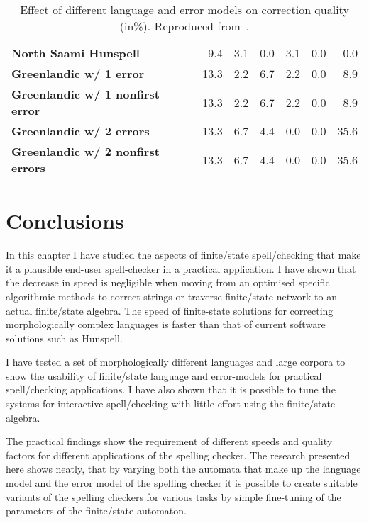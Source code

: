 \documentclass[officiallayout,final]{unihelcompling}
\begin{document}
\begin{table}
\begin{tabular}{|l|r|r|r|r|r|r|}
        \hline
        \bf North Saami Hunspell & 9.4 & 3.1 & 0.0 & 3.1 & 0.0 & 0.0 \\
          \bf Greenlandic w/ 1 error & 13.3 & 2.2 & 6.7 & 2.2 & 0.0 & 8.9 \\
 \bf Greenlandic w/ 1 nonfirst error & 13.3 & 2.2 & 6.7 & 2.2 & 0.0 & 8.9 \\
         \bf Greenlandic w/ 2 errors & 13.3 & 6.7 & 4.4 & 0.0 & 0.0 & 35.6 \\
\bf Greenlandic w/ 2 nonfirst errors & 13.3 & 6.7 & 4.4 & 0.0 & 0.0 & 35.6 \\
        \hline
    \end{tabular}

    \caption{Effect of different language and error models on correction 
        quality (in\%). Reproduced from~.
    \label{table:nejlt-2013-repro}}
\end{table}

\section{Conclusions}

In this chapter I have studied the aspects of finite\-/state spell\-/checking
that make it a plausible end-user spell-checker in a practical application. I
have shown that the decrease in speed is negligible when moving from an
optimised specific algorithmic methods to correct strings or traverse
finite\-/state network to an actual finite\-/state algebra. The
speed of finite-state solutions for correcting morphologically complex
languages is faster than that of current software solutions such as Hunspell.

I have tested a set of morphologically different languages and large corpora to
show the usability of finite\-/state language and error-models for practical
spell\-/checking applications. I have also shown that it is possible to tune
the systems for interactive spell\-/checking with little effort using the
finite\-/state algebra.

The practical findings show the requirement of different speeds and quality
factors for different applications of the spelling checker. The research
presented here shows neatly, that by varying both the automata that make up the
language model and the error model of the spelling checker it is possible to
create suitable variants of the spelling checkers for various tasks by simple
fine-tuning of the parameters of the finite\-/state automaton.
\end{document}
